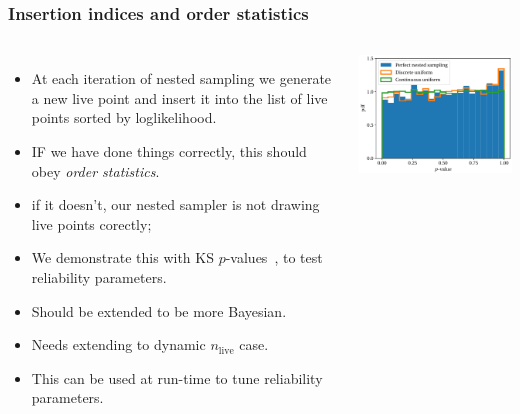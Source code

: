 \documentclass[aspectratio=169]{beamer}
\begin{document}
\begin{frame}
    \frametitle{Insertion indices and order statistics}
    \begin{columns}
    \begin{itemize}
        \item At each iteration of nested sampling we generate a new live point and insert it into the list of live points sorted by loglikelihood.
        \item IF we have done things correctly, this should obey \emph{order statistics}.
        \item if it doesn't, our nested sampler is not drawing live points corectly;
        \item We demonstrate this with KS $p$-values~, to test reliability parameters.
        \item Should be extended to be more Bayesian.
        \item Needs extending to dynamic $n_\mathrm{live}$ case.
        \item This can be used at run-time to tune reliability parameters.
    \end{itemize}
        \includegraphics[width=\textwidth]{figures/indices}
    \end{columns}
\end{frame}
\end{document}

